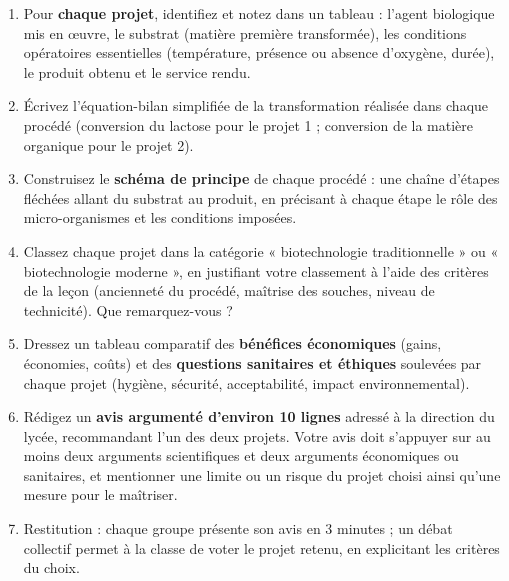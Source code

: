 \documentclass[11pt]{article}
\newcommand{\cle}[1]{{\popxbold\color{popdark}#1}}
\newcounter{popsec}
\newcounter{popsub}
\newcommand{\courssub}[1]{%
  \stepcounter{popsub}%
  \par\vspace{9pt}\noindent{\popxbold\fontsize{11.5}{13}\selectfont\color{popink}{\color{poporange}\thepopsec.\thepopsub}\hspace{6pt}#1}\par\nopagebreak\vspace{4pt}
}
\begin{document}
\begin{enumerate}
\item Pour \textbf{chaque projet}, identifiez et notez dans un tableau : l'\cle{agent biologique} mis en œuvre, le \cle{substrat} (matière première transformée), les \cle{conditions opératoires} essentielles (température, présence ou absence d'oxygène, durée), le \cle{produit} obtenu et le \cle{service} rendu.
\item Écrivez l'équation-bilan simplifiée de la transformation réalisée dans chaque procédé (conversion du lactose pour le projet 1 ; conversion de la matière organique pour le projet 2).
\item Construisez le \textbf{schéma de principe} de chaque procédé : une chaîne d'étapes fléchées allant du substrat au produit, en précisant à chaque étape le rôle des micro-organismes et les conditions imposées.
\item Classez chaque projet dans la catégorie « biotechnologie \cle{traditionnelle} » ou « biotechnologie \cle{moderne} », en justifiant votre classement à l'aide des critères de la leçon (ancienneté du procédé, maîtrise des souches, niveau de technicité). Que remarquez-vous ?
\item Dressez un tableau comparatif des \textbf{bénéfices économiques} (gains, économies, coûts) et des \textbf{questions sanitaires et éthiques} soulevées par chaque projet (hygiène, sécurité, acceptabilité, impact environnemental).
\item Rédigez un \textbf{avis argumenté d'environ 10 lignes} adressé à la direction du lycée, recommandant l'un des deux projets. Votre avis doit s'appuyer sur au moins deux arguments scientifiques et deux arguments économiques ou sanitaires, et mentionner une limite ou un risque du projet choisi ainsi qu'une mesure pour le maîtriser.
\item Restitution : chaque groupe présente son avis en 3 minutes ; un débat collectif permet à la classe de voter le projet retenu, en explicitant les critères du choix.
\end{enumerate}

\courssub{Ressources à mobiliser}
\end{document}

